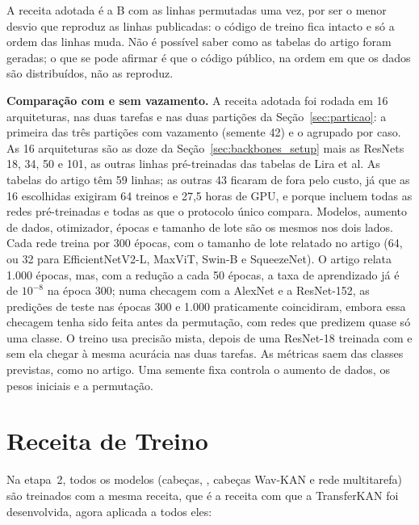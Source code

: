 

A receita adotada é a B com as linhas permutadas uma vez, por ser o menor desvio que reproduz as linhas publicadas: o código de treino fica intacto e só a ordem das linhas muda. Não é possível saber como as tabelas do artigo foram geradas; o que se pode afirmar é que o código público, na ordem em que os dados são distribuídos, não as reproduz.

\textbf{Comparação com e sem vazamento.} A receita adotada foi rodada em 16 arquiteturas, nas duas tarefas e nas duas partições da Seção~\ref{sec:particao}: a primeira das três partições com vazamento (semente 42) e o  agrupado por caso. As 16 arquiteturas são as doze da Seção~\ref{sec:backbones_setup} mais as ResNets 18, 34, 50 e 101, as outras linhas pré-treinadas das tabelas de Lira et al. As tabelas do artigo têm 59 linhas; as outras 43 ficaram de fora pelo custo, já que as 16 escolhidas exigiram 64 treinos e 27,5 horas de \gls{GPU}, e porque incluem todas as redes pré-treinadas e todas as que o protocolo único compara. Modelos, aumento de dados, otimizador, épocas e tamanho de lote são os mesmos nos dois lados. Cada rede treina por 300 épocas, com o tamanho de lote relatado no artigo (64, ou 32 para EfficientNetV2-L, MaxViT, Swin-B e SqueezeNet). O artigo relata 1.000 épocas, mas, com a redução a cada 50 épocas, a taxa de aprendizado já é de $10^{-8}$ na época 300; numa checagem com a AlexNet e a ResNet-152, as predições de teste nas épocas 300 e 1.000 praticamente coincidiram, embora essa checagem tenha sido feita antes da permutação, com redes que predizem quase só uma classe. O treino usa precisão mista, depois de uma ResNet-18 treinada com e sem ela chegar à mesma acurácia nas duas tarefas. As métricas saem das classes previstas, como no artigo. Uma semente fixa controla o aumento de dados, os pesos iniciais e a permutação.

\section{Receita de Treino}
\label{sec:recipe}

Na etapa~2, todos os modelos (cabeças, , cabeças Wav-KAN e rede multitarefa) são treinados com a mesma receita, que é a receita com que a TransferKAN foi desenvolvida, agora aplicada a todos eles:

